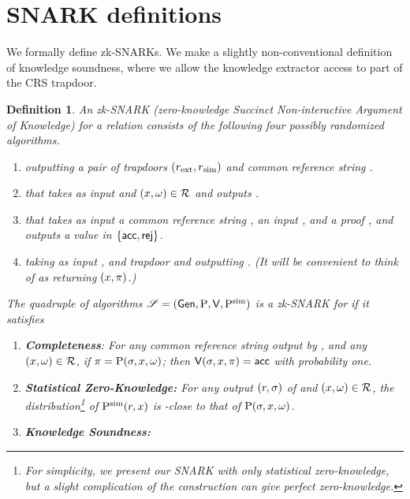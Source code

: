\documentclass[11pt]{article}
\numberwithin{figure}{section} %
\newtheorem{dfn}[thm]{Definition}
\newcommand{\set}[1]{\ensuremath{\left\{#1\right\}}\xspace}
\begin{document}
\section{SNARK definitions}
We formally define zk-SNARKs.
We make a slightly non-conventional definition of knowledge soundness, where we allow the knowledge extractor access to
part of the CRS trapdoor.
\begin{dfn}\label{dfn:zkSNARK}
An zk-SNARK \snark (zero-knowledge Succinct Non-interactive Argument of Knowledge) for a relation \rel consists of the following four possibly randomized algorithms.
\begin{enumerate}
 \item \gen outputting a pair of trapdoors $(r_{\mathrm{ext}},r_{\mathrm{sim}})$ and common reference string \crs.
 \item \prv that takes as input \crs and $(x,\omega)\in \mathcal{R}$ and outputs
 \prf.
 \item \ver that takes as input a common reference string \crs, an input \inp, and a proof \prf, and outputs a value in \set{\acc,\rej}.
 \item \simprv taking as input \inp, and trapdoor \trapdoorsim and outputting  \prf.
 (It will be convenient to think of \simprv as returning $(x,\pi)$.)
\end{enumerate}

The quadruple of algorithms $\mathscr S = (\mathsf{Gen},\mathrm{P},\mathsf{V},\mathrm{P^{sim}})$ is a zk-SNARK for \rel if it satisfies

\begin{enumerate}
 \item \textbf{Completeness}: For any common reference string \crs output by \gen, and any $(x,\omega)\in \mathcal{R}$, if $\pi = \mathrm{P}(\sigma,x,\omega)$; then
 $\mathsf{V}(\sigma,x,\pi) = \mathsf{acc}$ with probability one.
\item \textbf{Statistical Zero-Knowledge:} For any output $(r,\sigma)$ of \gen and $(x,\omega)\in \mathcal{R}$, the distribution\footnote{For simplicity, we present our SNARK with only statistical zero-knowledge, but a slight complication of the construction can give perfect zero-knowledge.} of $\mathrm{P^{sim}}(r,x)$
is \negl-close to that of $\mathrm{P}(\sigma,x,\omega)$.

\item \textbf{Knowledge Soundness:}


\end{enumerate}
\end{dfn}
\end{document}
